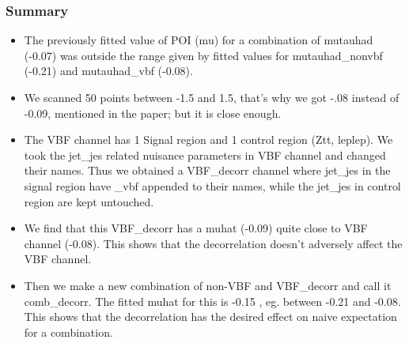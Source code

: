 \documentclass{beamer}
\begin{document}
\begin{frame}
\frametitle{Summary}
\begin{scriptsize}
\vspace*{0.2cm}
\begin{itemize}
\item The previously fitted value of POI (mu) for a combination of mutauhad (-0.07) was outside the range given by fitted values for mutauhad\_nonvbf (-0.21) and mutauhad\_vbf (-0.08).

\item We scanned 50 points between -1.5 and 1.5, that's why we got -.08 instead of -0.09, mentioned in the paper; but it is close enough.

\item The VBF channel has 1 Signal region and 1 control region (Ztt, leplep).
We took the jet\_jes related nuisance parameters in VBF channel and changed their names.
Thus we obtained a VBF\_decorr channel where jet\_jes in the signal region have \_vbf appended to their names, while the jet\_jes in control region are kept untouched.

\item
We find that this VBF\_decorr has a muhat (-0.09) quite close to VBF channel (-0.08).
This shows that the decorrelation doesn't adversely affect the VBF channel.

\item
Then we make a new combination of non-VBF and VBF\_decorr and call it comb\_decorr.
The fitted muhat for this is -0.15 , eg. between -0.21 and -0.08.
This shows that the decorrelation has the desired effect on naive expectation for a combination.

\end{itemize}
\end{scriptsize}
\end{frame}
\end{document}
